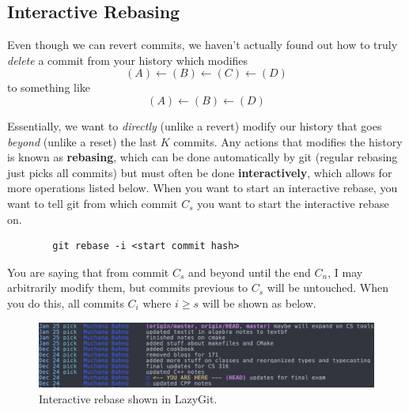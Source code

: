 \documentclass{article}
\begin{document}
  \subsection{Interactive Rebasing} 

    Even though we can revert commits, we haven't actually found out how to truly \textit{delete} a commit from your history which modifies 
    \begin{equation}
      (A) \leftarrow (B) \leftarrow (C) \leftarrow (D)
    \end{equation} 
    to something like 
    \begin{equation}
      (A) \leftarrow (B) \leftarrow (D)
    \end{equation} 
  
    \begin{definition}[Rebasing]
      Essentially, we want to \textit{directly} (unlike a revert) modify our history that goes \textit{beyond} (unlike a reset) the last $K$ commits. Any actions that modifies the history is known as \textbf{rebasing}, which can be done automatically by git (regular rebasing just picks all commits) but must often be done \textbf{interactively}, which allows for more operations listed below. When you want to start an interactive rebase, you want to tell git from which commit $C_s$ you want to start the interactive rebase on. 
      \begin{lstlisting}
        git rebase -i <start commit hash>
      \end{lstlisting}
      You are saying that from commit $C_s$ and beyond until the end $C_n$, I may arbitrarily modify them, but commits previous to $C_s$ will be untouched. When you do this, all commits $C_i$ where $i \geq s$ will be shown as below. 

      \begin{figure}[H]
        \centering 
        \includegraphics[scale=0.3]{img/rebase.png}
        \caption{Interactive rebase shown in LazyGit.} 
        \label{fig:rebase}
      \end{figure}


\end{definition}
\end{document}
